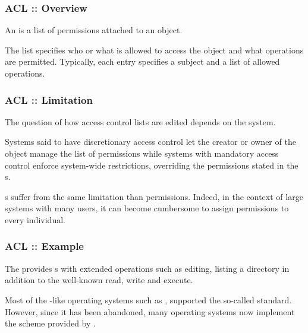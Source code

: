 
\begin{frame}
  \frametitle{ACL :: Overview}

  An  is a list of permissions
  attached to an object.

  \-

  The list specifies who or what is allowed to access the object and what
  operations are permitted. Typically, each  entry specifies a
  subject and a list of allowed operations.
\end{frame}


\begin{frame}
  \frametitle{ACL :: Limitation}

  The question of how access control lists are edited depends on the system.

  \-

  Systems said to have discretionary access control let the creator or owner
  of the object manage the list of permissions while systems with mandatory
  access control enforce system-wide restrictions, overriding the permissions
  stated in the s.

  \-

  s suffer from the same limitation than  permissions.
  Indeed, in the context of large systems with many users, it can become
  cumbersome to assign permissions to every individual.
\end{frame}


\begin{frame}
  \frametitle{ACL :: Example}

  The  provides s with extended
  operations such as editing, listing a directory \etc{} in addition to the
  well-known read, write and execute.

  \-

  Most of the -like operating systems such as ,
   \etc{} supported the so-called  standard.
  However, since it has been abandoned, many operating systems now implement
  the  scheme provided by  .
\end{frame}


